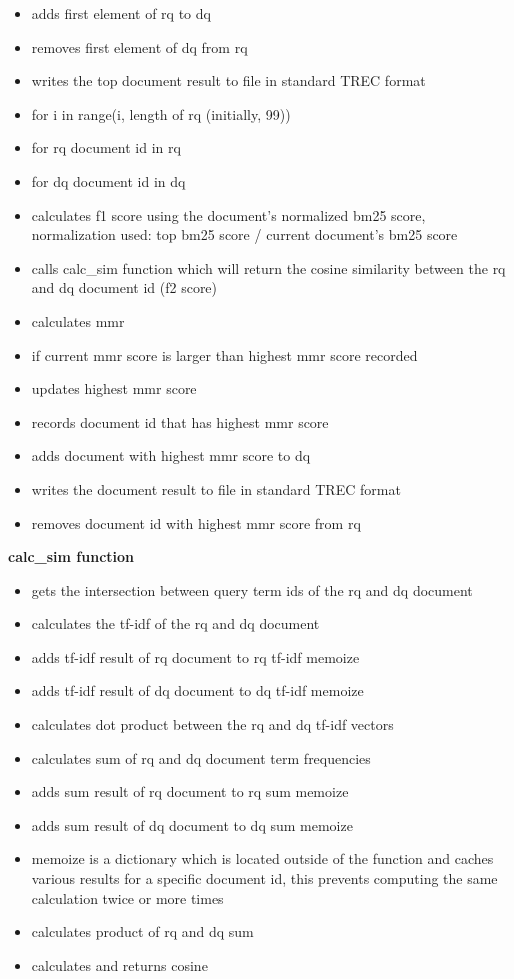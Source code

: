 \documentclass{article} %
\begin{document}
\begin{itemize}
    \item adds first element of rq to dq
    \item removes first element of dq from rq
    \item writes the top document result to file in standard TREC format
    \item for i in range(i, length of rq (initially, 99))
    \item for rq document id in rq
    \item for dq document id in dq
    \item calculates f1 score using the document's normalized bm25 score, normalization used: top bm25 score / current document's bm25 score
    \item calls calc\_sim function which will return the cosine similarity between the rq and dq document id (f2 score)
    \item calculates mmr
    \item if current mmr score is larger than highest mmr score recorded
    \item updates highest mmr score
    \item records document id that has highest mmr score
    \item adds document with highest mmr score to dq
    \item writes the document result to file in standard TREC format
    \item removes document id with highest mmr score from rq
\end{itemize}

\textbf{calc\_sim function}

\begin{itemize}
    \item gets the intersection between query term ids of the rq and dq document
    \item calculates the tf-idf of the rq and dq document
    \item adds tf-idf result of rq document to rq tf-idf memoize
    \item adds tf-idf result of dq document to dq tf-idf memoize
    \item calculates dot product between the rq and dq tf-idf vectors
    \item calculates sum of rq and dq document term frequencies
    \item adds sum result of rq document to rq sum memoize
    \item adds sum result of dq document to dq sum memoize
    \item memoize is a dictionary which is located outside of the function and caches various results for a specific document id, this prevents computing the same calculation twice or more times
    \item calculates product of rq and dq sum
    \item calculates and returns cosine
\end{itemize}
\end{document}
